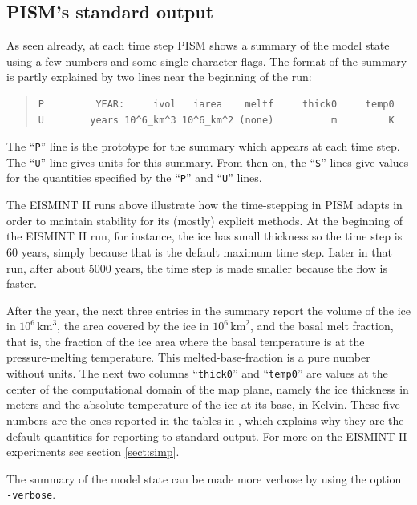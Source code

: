\documentclass[11pt,final]{amsart}
\renewcommand{\t}[1]{\texttt{#1}}
\begin{document}
\subsection{PISM's standard output}   As seen already, at each time step PISM shows a summary of the model state using a few numbers and some single character flags.  The format of the summary is partly explained by two lines near the beginning of the run:

\small\begin{quote}
\begin{verbatim}
P         YEAR:     ivol   iarea    meltf     thick0     temp0
U        years 10^6_km^3 10^6_km^2 (none)          m         K
\end{verbatim}
\end{quote}\normalsize

The ``\t{P}'' line is the prototype for the summary which appears at each time step.  The ``\t{U}'' line gives units for this summary.  From then on, the ``\t{S}'' lines give values for the quantities specified by the  ``\t{P}'' and ``\t{U}'' lines.

The EISMINT II runs above illustrate how the time-stepping in PISM adapts in order to maintain stability for its (mostly) explicit methods.  At the beginning of the EISMINT II run, for instance, the ice has small thickness so the time step is 60 years, simply because that is the default maximum time step.  Later in that run, after about 5000 years, the time step is made smaller because the flow is faster.

After the year, the next three entries in the summary report the volume of the ice in $10^6 \,\text{km}^3$, the area covered by the ice in $10^6\,\text{km}^2$, and the basal melt fraction, that is, the fraction of the ice area where the basal temperature is at the pressure-melting temperature.  This melted-base-fraction is a pure number without units.  The next two columns ``\texttt{thick0}'' and ``\texttt{temp0}'' are values at the center of the computational domain of the map plane, namely the ice thickness in meters and the absolute temperature of the ice at its base, in Kelvin.  These five numbers are the ones reported in the tables in \cite{EISMINT00}, which explains why they are the default quantities for reporting to standard output.  For more on the EISMINT II experiments see section \ref{sect:simp}.

The summary of the model state can be made more verbose by using the option \verb|-verbose|.  
\end{document}
